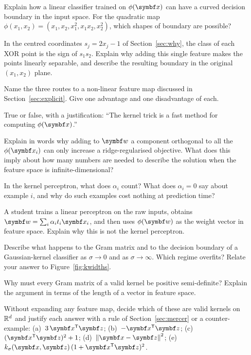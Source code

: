 \documentclass[11pt]{article}
\newcommand{\w}{\vect{w}}
\newcommand{\z}{\vect{z}}
\begin{document}
\begin{questions}
\begin{conceptual}
\item Explain how a linear classifier trained on $\phi(\x)$ can have a curved decision boundary in the input space. For the
  quadratic map $\phi(x_1, x_2) = (x_1, x_2, x_1^2, x_1x_2, x_2^2)$, which shapes of boundary are possible?
\item In the centred coordinates $s_j = 2x_j - 1$ of Section~\ref{sec:why}, the class of each XOR point is the sign of
  $s_1s_2$. Explain why adding this single feature makes the points linearly separable, and describe the resulting
  boundary in the original $(x_1, x_2)$ plane.
\item Name the three routes to a non-linear feature map discussed in Section~\ref{sec:explicit}. Give one advantage and
  one disadvantage of each.
\item True or false, with a justification: ``The kernel trick is a fast method for computing $\phi(\x)$.''
\item Explain in words why adding to $\w$ a component orthogonal to all the $\phi(\x_i)$ can only increase a
  ridge-regularised objective. What does this imply about how many numbers are needed to describe the solution when the
  feature space is infinite-dimensional?
\item In the kernel perceptron, what does $\alpha_i$ count? What does $\alpha_i = 0$ say about example $i$, and why do
  such examples cost nothing at prediction time?
\item A student trains a linear perceptron on the raw inputs, obtains $\w = \sum_i \alpha_it_i\x_i$, and then uses
  $\phi(\w)$ as the weight vector in feature space. Explain why this is not the kernel perceptron.
\item Describe what happens to the Gram matrix and to the decision boundary of a Gaussian-kernel classifier as
  $\sigma \to 0$ and as $\sigma \to \infty$. Which regime overfits? Relate your answer to Figure~\ref{fig:kwidths}.
\item Why must every Gram matrix of a valid kernel be positive semi-definite? Explain the argument in terms of the length of
  a vector in feature space.
\item Without expanding any feature map, decide which of these are valid kernels on $\mathbb{R}^d$ and justify each answer with a rule
  of Section~\ref{sec:mercer} or a counter-example: (a)~$3\,\x\T\z$; (b)~$-\x\T\z$; (c)~$(\x\T\z)^2 + 1$;
  (d)~$\norm{\x - \z}^2$; (e)~$k_\sigma(\x, \z)\,(1 + \x\T\z)^2$.

\end{conceptual}
\end{questions}
\end{document}
